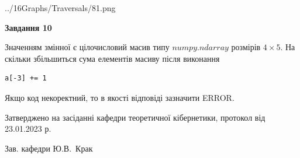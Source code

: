 \documentclass[12pt, ukrainian]{article}
\begin{document}
{\begin {large}
\begin{center}
	{../16Graphs/Traversals/81.png}
\end{center}\par
\newpage

{\begin {center}\textbf{Завдання 10}\end {center}}\par
Значенням змінної  є цілочисловий масив типу $numpy.ndarray$ розмірів $4{\times}5$. На скільки збільшиться сума елементів масиву  після виконання
\begin{verbatim}
a[-3] += 1
\end{verbatim}


Якщо код некоректний, то в якості відповіді зазначити ERROR.\par
\newpage


\end {large}
}
{\smallskip \begin {small} Затверджено на засіданні кафедри теоретичної кібернетики, протокол  від   23.01.2023 р.\par\smallskip\smallskip
{\parbox {6.5 cm}{Зав. кафедри \dotfill Ю.В.~Крак}} \end{small}}
\end{document}
